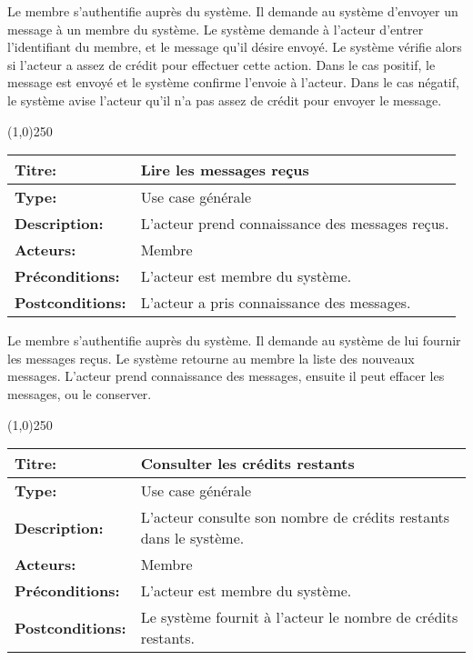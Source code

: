\documentclass[letterpaper,11pt]{letter}
\begin{document}
Le membre s'authentifie auprès du système. Il demande au système d'envoyer un message à un membre du système. Le système demande à l'acteur d'entrer 
l'identifiant du membre, et le message qu'il désire envoyé. Le système vérifie alors si l'acteur a assez de crédit pour effectuer cette action. Dans
le cas positif, le message est envoyé et le système confirme l'envoie à l'acteur. Dans le cas négatif, le système avise l'acteur qu'il n'a pas assez
de crédit pour envoyer le message.

\begin{center}
\line(1,0){250}
\end{center}

\begin{tabular}{|l|p{}|}
  \hline
{\bf Titre:} & Lire les messages reçus\\
  \hline
{\bf Type:} & Use case générale\\
\hline
{\bf Description:} & L'acteur prend connaissance des messages reçus.\\
\hline
{\bf Acteurs:} & Membre\\
\hline
{\bf Préconditions:} & L'acteur est membre du système.\\
\hline
{\bf Postconditions:} & L'acteur a pris connaissance des messages. \\
\hline
\end{tabular}

Le membre s'authentifie auprès du système. Il demande au système de lui fournir les messages reçus. Le système retourne au membre la liste des nouveaux messages.
L'acteur prend connaissance des messages, ensuite il peut effacer les messages, ou le conserver.

\begin{center}
\line(1,0){250}
\end{center}

\begin{tabular}{|l|p{}|}
  \hline
{\bf Titre:} & Consulter les crédits restants\\
  \hline
{\bf Type:} & Use case générale\\
\hline
{\bf Description:} & L'acteur consulte son nombre de crédits restants dans le système.\\
\hline
{\bf Acteurs:} & Membre\\
\hline
{\bf Préconditions:} & L'acteur est membre du système.\\
\hline
{\bf Postconditions:} & Le système fournit à l'acteur le nombre de crédits restants.\\
\hline
\end{tabular}
\end{document}
